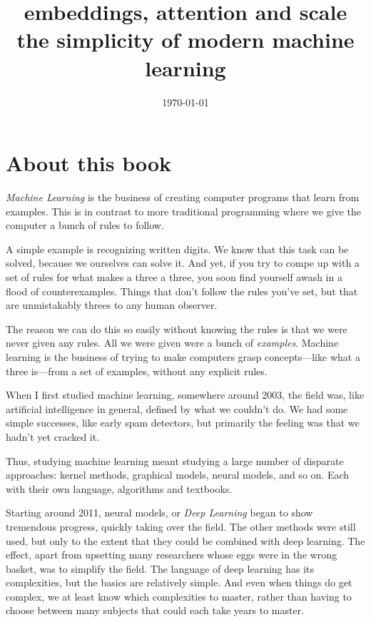 \documentclass{pca}
\title{embeddings, attention and scale\\ the simplicity of modern machine learning}
\date{\today}
\theoremstyle{theorem}
\theoremstyle{definition}
\theoremstyle{proof}
\begin{document}
\maketitle

\tableofcontents

\chapter*{About this book}

\emph{Machine Learning} is the business of creating computer programs that learn from examples. This is in contrast to more traditional programming where we give the computer a bunch of rules to follow.

A simple example is recognizing written digits. We know that this task can be solved, because we ourselves can solve it. And yet, if you try to compe up with a set of rules for what makes a three a three, you soon find yourself awash in a flood of counterexamples. Things that don't follow the rules you've set, but that are unmistakably threes to any human observer.


The reason we can do this so easily without knowing the rules is that we were never given any rules. All we were given were a bunch of \emph{examples}. Machine learning is the business of trying to make computers grasp concepts---like what a three is---from a set of examples, without any explicit rules. 

When I first studied machine learning, somewhere around 2003, the field was, like artificial intelligence in general, defined by what we couldn't do. We had some simple successes, like early spam detectors, but primarily the feeling was that we hadn't yet cracked it. 

Thus, studying machine learning meant studying a large number of disparate approaches: kernel methods, graphical models, neural models, and so on. Each with their own language, algorithms and textbooks. 

Starting around 2011, neural models, or \emph{Deep Learning} began to show tremendous progress, quickly taking over the field. The other methods were still used, but only to the extent that they could be combined with deep learning. The effect, apart from upsetting many researchers whose eggs were in the wrong basket, was to simplify the field. The language of deep learning has its complexities, but the basics are relatively simple. And even when things do get complex, we at least know which complexities to master, rather than having to choose between many subjects that could each take years to master.
\end{document}

